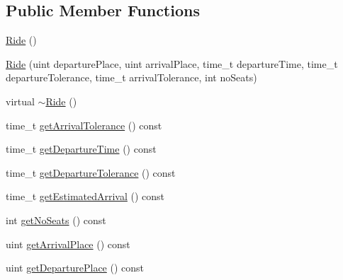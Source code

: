 \subsection*{Public Member Functions}
\begin{DoxyCompactItemize}
\item 
\hyperlink{class_ride_aef9cd8f2760f8e0b46eb268e69b007b9}{Ride} ()
\item 
\hyperlink{class_ride_a7642ec84a4f8522c58179962b142b276}{Ride} (uint departure\+Place, uint arrival\+Place, time\+\_\+t departure\+Time, time\+\_\+t departure\+Tolerance, time\+\_\+t arrival\+Tolerance, int no\+Seats)
\item 
virtual \hyperlink{class_ride_a51b5edd7f67bf27f5225d7e2c211c34d}{$\sim$\+Ride} ()
\item 
time\+\_\+t \hyperlink{class_ride_a7e031c140104824a87bc3664354a8d8b}{get\+Arrival\+Tolerance} () const 
\item 
time\+\_\+t \hyperlink{class_ride_a15b59e580fc86bba03302c1b14c0e733}{get\+Departure\+Time} () const 
\item 
time\+\_\+t \hyperlink{class_ride_a09d280e7b7be35d8c1957316b1fdfa53}{get\+Departure\+Tolerance} () const 
\item 
time\+\_\+t \hyperlink{class_ride_a498db4e46f6520b747a18156855ecd27}{get\+Estimated\+Arrival} () const 
\item 
int \hyperlink{class_ride_ac6ce2ae3098bf408b70ca71ecdfa1278}{get\+No\+Seats} () const 
\item 
uint \hyperlink{class_ride_a50e27ef44b2bb35fb5da873f89fc1990}{get\+Arrival\+Place} () const 
\item 
uint \hyperlink{class_ride_af49465a0f4c2f9eb896f8c102b1d5c1d}{get\+Departure\+Place} () const 
\end{DoxyCompactItemize}
